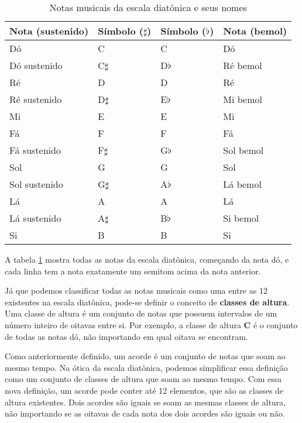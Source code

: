     \begin{table}
    \centering
    \begin{tabular}{|l|l|l|l|}
        \hline
        \textbf{Nota (sustenido)} & \textbf{Símbolo ($\sharp$)}   &  \textbf{Símbolo ($\flat$)} & \textbf{Nota (bemol)} \\
        \hline
        Dó             &  C          &  C         &  Dó            \\
        Dó sustenido   &  C$\sharp$  &  D$\flat$  &  Ré bemol      \\
        Ré             &  D          &  D         &  Ré            \\
        Ré sustenido   &  D$\sharp$  &  E$\flat$  &  Mi bemol      \\
        Mi             &  E          &  E         &  Mi            \\
        Fá             &  F          &  F         &  Fá            \\
        Fá sustenido   &  F$\sharp$  &  G$\flat$  &  Sol bemol     \\
        Sol            &  G          &  G         &  Sol           \\
        Sol sustenido  &  G$\sharp$  &  A$\flat$  &  Lá bemol      \\
        Lá             &  A          &  A         &  Lá            \\
        Lá sustenido   &  A$\sharp$  &  B$\flat$  &  Si bemol      \\
        Si             &  B          &  B         &  Si            \\
        \hline
    \end{tabular}
    \caption{Notas musicais da escala diatônica e seus nomes}
    \label{tabela:notas}
    \end{table}
    
    A tabela \ref{tabela:notas} mostra todas as notas da escala diatônica, começando da nota dó, e cada linha tem a nota exatamente um semitom acima da nota anterior.

    Já que podemos classificar todas as notas musicais como uma entre as 12 existentes na escala diatônica, pode-se definir o conceito de \textbf{classes de altura}. Uma classe de altura é um conjunto de notas que possuem intervalos de um número inteiro de oitavas entre si. Por exemplo, a classe de altura \textbf{C} é o conjunto de todas as notas dó, não importando em qual oitava se encontram.
     
    Como anteriormente definido, um acorde é um conjunto de notas que soam ao mesmo tempo. Na ótica da escala diatônica, podemos simplificar essa definição como um conjunto de classes de altura que soam ao mesmo tempo. Com essa nova definição, um acorde pode conter até 12 elementos, que são as classes de altura existentes. Dois acordes são iguais se soam as mesmas classes de altura, não importando se as oitavas de cada nota dos dois acordes são iguais ou não.
    
